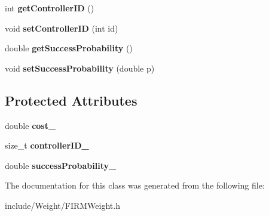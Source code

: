 \begin{DoxyCompactItemize}
\item 
\hypertarget{class_f_i_r_m_weight_af846636ead4117eee04ca622b0985c0f}{int {\bfseries get\-Controller\-I\-D} ()}\label{class_f_i_r_m_weight_af846636ead4117eee04ca622b0985c0f}

\item 
\hypertarget{class_f_i_r_m_weight_a7b19ae273970b48e156f79a2ef085b71}{void {\bfseries set\-Controller\-I\-D} (int id)}\label{class_f_i_r_m_weight_a7b19ae273970b48e156f79a2ef085b71}

\item 
\hypertarget{class_f_i_r_m_weight_a06b9e832fb364609e8d55fa9b4822dd9}{double {\bfseries get\-Success\-Probability} ()}\label{class_f_i_r_m_weight_a06b9e832fb364609e8d55fa9b4822dd9}

\item 
\hypertarget{class_f_i_r_m_weight_a464ea0457387ec93efa2342d27789d3e}{void {\bfseries set\-Success\-Probability} (double p)}\label{class_f_i_r_m_weight_a464ea0457387ec93efa2342d27789d3e}

\end{DoxyCompactItemize}
\subsection*{\-Protected \-Attributes}
\begin{DoxyCompactItemize}
\item 
\hypertarget{class_f_i_r_m_weight_a87d6234da67d63e0ee378f4817ba79b6}{double {\bfseries cost\-\_\-}}\label{class_f_i_r_m_weight_a87d6234da67d63e0ee378f4817ba79b6}

\item 
\hypertarget{class_f_i_r_m_weight_a25113f31344f98970105be8c54a2f78d}{size\-\_\-t {\bfseries controller\-I\-D\-\_\-}}\label{class_f_i_r_m_weight_a25113f31344f98970105be8c54a2f78d}

\item 
\hypertarget{class_f_i_r_m_weight_a11e740f671713d5859367648434f4b17}{double {\bfseries success\-Probability\-\_\-}}\label{class_f_i_r_m_weight_a11e740f671713d5859367648434f4b17}

\end{DoxyCompactItemize}


\-The documentation for this class was generated from the following file\-:\begin{DoxyCompactItemize}
\item 
include/\-Weight/\-F\-I\-R\-M\-Weight.\-h\end{DoxyCompactItemize}
